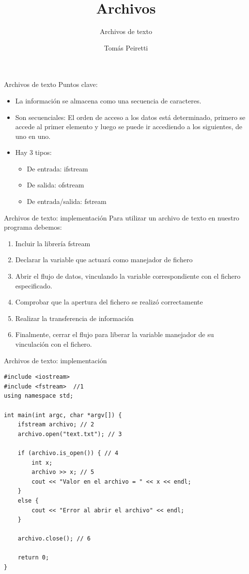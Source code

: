 \documentclass[12pt]{beamer}
\title{Archivos}
\subtitle{Archivos de texto}
\author{Tomás Peiretti}
\date{}
\begin{document}
\maketitle

\begin{frame}{Archivos de texto}
    Puntos clave:
    \begin{itemize}
        \item La información se almacena como una secuencia de caracteres.
        \item Son secuenciales: El orden de acceso a los datos está determinado, primero se accede al primer elemento y luego se puede ir accediendo a los siguientes, de uno en uno.
        \item Hay 3 tipos:
        \begin{itemize}
            \item De entrada: \alert{ifstream}
            \item De salida: \alert{ofstream}
            \item De entrada/salida: \alert{fstream}
        \end{itemize}
    \end{itemize}
\end{frame}

\begin{frame}{Archivos de texto: implementación}
    Para utilizar un archivo de texto en nuestro programa debemos:
        \begin{enumerate}
            \item Incluir la librería fstream
            \item Declarar la variable que actuará como manejador de fichero
            \item Abrir el flujo de datos, vinculando la variable correspondiente con el fichero especificado.
            \item Comprobar que la apertura del fichero se realizó correctamente
            \item Realizar la transferencia de información
            \item Finalmente, cerrar el flujo para liberar la variable manejador de su vinculación con el fichero.
        \end{enumerate}
\end{frame}

\begin{frame}[fragile]{Archivos de texto: implementación}
\begin{lstlisting}[basicstyle=\scriptsize]
#include <iostream>
#include <fstream>  //1
using namespace std;

int main(int argc, char *argv[]) {
	ifstream archivo; // 2
	archivo.open("text.txt"); // 3
	
	if (archivo.is_open()) { // 4
		int x;
		archivo >> x; // 5
		cout << "Valor en el archivo = " << x << endl;
	}
	else {
		cout << "Error al abrir el archivo" << endl;
	}
	
	archivo.close(); // 6
	
	return 0;
}
\end{lstlisting}
\end{frame}
\end{document}
